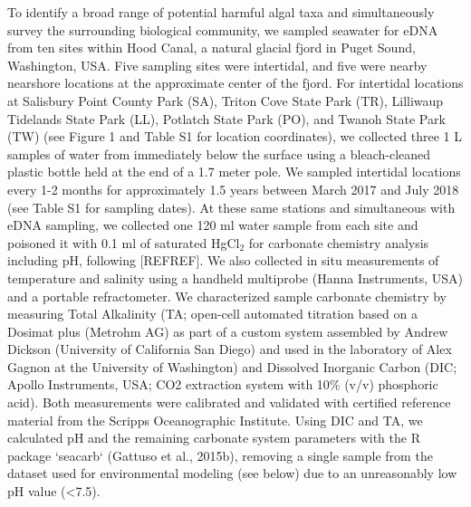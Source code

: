 \documentclass[
]{article}
\begin{document}
To identify a broad range of potential harmful algal taxa and
simultaneously survey the surrounding biological community, we sampled
seawater for eDNA from ten sites within Hood Canal, a natural glacial
fjord in Puget Sound, Washington, USA. Five sampling sites were
intertidal, and five were nearby nearshore locations at the approximate
center of the fjord. For intertidal locations at Salisbury Point County
Park (SA), Triton Cove State Park (TR), Lilliwaup Tidelands State Park
(LL), Potlatch State Park (PO), and Twanoh State Park (TW) (see Figure 1
and Table S1 for location coordinates), we collected three 1 L samples
of water from immediately below the surface using a bleach-cleaned
plastic bottle held at the end of a 1.7 meter pole. We sampled
intertidal locations every 1-2 months for approximately 1.5 years
between March 2017 and July 2018 (see Table S1 for sampling dates). At
these same stations and simultaneous with eDNA sampling, we collected
one 120 ml water sample from each site and poisoned it with 0.1 ml of
saturated HgCl\({_2}\) for carbonate chemistry analysis including pH,
following {[}REFREF{]}. We also collected in situ measurements of
temperature and salinity using a handheld multiprobe (Hanna Instruments,
USA) and a portable refractometer. We characterized sample carbonate
chemistry by measuring Total Alkalinity (TA; open-cell automated
titration based on a Dosimat plus (Metrohm AG) as part of a custom
system assembled by Andrew Dickson (University of California San Diego)
and used in the laboratory of Alex Gagnon at the University of
Washington) and Dissolved Inorganic Carbon (DIC; Apollo Instruments,
USA; CO2 extraction system with 10\% (v/v) phosphoric acid). Both
measurements were calibrated and validated with certified reference
material from the Scripps Oceanographic Institute. Using DIC and TA, we
calculated pH and the remaining carbonate system parameters with the R
package `seacarb` (Gattuso et al., 2015b), removing a single sample from
the dataset used for environmental modeling (see below) due to an
unreasonably low pH value (\textless7.5).
\end{document}
